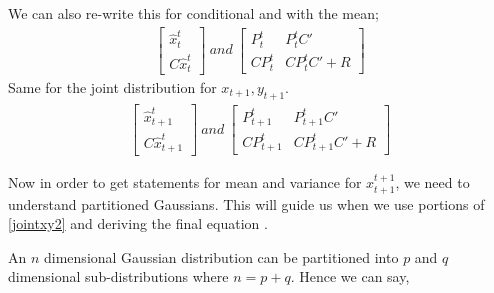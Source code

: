 We can also re-write this for conditional and with the mean;
\begin{eqnarray}
\left[ \begin{array}{c}
      \hat{x}_{t}^t \\
      C\hat{x}_{t}^t
      \end{array} \right]
\:and\:      
\left[ \begin{array}{cc}
      P_{t}^t & P_{t}^tC' \\
      CP_{t}^t & CP_{t}^tC'+R
      \end{array} \right] \label{jointxy}
\end{eqnarray}
Same for the joint distribution for $x_{t+1}, y_{t+1}$.
\begin{eqnarray}
\left[ \begin{array}{c}
      \hat{x}_{t+1}^t \\
      C\hat{x}_{t+1}^t
      \end{array} \right]
\:and\:      
\left[ \begin{array}{cc}
      P_{t+1}^t & P_{t+1}^tC' \\
      CP_{t+1}^t & CP_{t+1}^tC'+R
      \end{array} \right] \label{jointxy2}
\end{eqnarray}

Now in order to get statements for mean and variance for $x_{t+1}^{t+1}$, we
need to understand partitioned Gaussians. This will guide us when we use
portions of \eqref{jointxy2} and deriving the final equation \cite{jordan}. 

An $n$ dimensional Gaussian distribution can be partitioned into $p$ and $q$
dimensional sub-distributions where $n = p + q$. Hence we can say,


